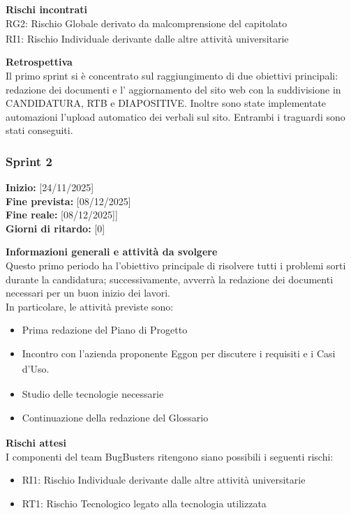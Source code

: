 \documentclass[a4paper,12pt]{article}
\begin{document}
\noindent\textbf{Rischi incontrati}\\
RG2: Rischio Globale derivato da malcomprensione del capitolato\textsubscript{}\\
RI1: Rischio Individuale derivante dalle altre attività universitarie

\noindent\textbf{Retrospettiva}\\
Il primo sprint si è concentrato sul raggiungimento di due obiettivi principali: redazione dei documenti e l' aggiornamento del sito web con la suddivisione in CANDIDATURA, RTB e DIAPOSITIVE. Inoltre sono state implementate automazioni l'upload automatico dei verbali sul sito. Entrambi i traguardi sono stati conseguiti. 

\subsubsection{Sprint 2}

\textbf{Inizio:} [24/11/2025] \\
\textbf{Fine prevista:} [08/12/2025] \\
\textbf{Fine reale:} [08/12/2025]] \\
\textbf{Giorni di ritardo:} [0]

\noindent\textbf{Informazioni generali e attività da svolgere}\\
Questo primo periodo ha l'obiettivo principale di risolvere tutti i problemi sorti durante la
candidatura; successivamente, avverrà la redazione dei documenti necessari per un buon
inizio dei lavori.\\
In particolare, le attività previste sono:
\begin{itemize}
    \item Prima redazione del Piano di Progetto
    \item Incontro con l'azienda proponente\textsubscript{} Eggon per discutere i requisiti e i Casi d'Uso\textsubscript{}.
    \item Studio delle tecnologie necessarie
    \item Continuazione della redazione del Glossario\textsubscript{}
\end{itemize}

\noindent\textbf{Rischi attesi}\\
I componenti del team BugBusters ritengono siano possibili i seguenti rischi:
\begin{itemize}
    \item RI1: Rischio Individuale derivante dalle altre attività universitarie
    \item RT1: Rischio Tecnologico legato alla tecnologia utilizzata
\end{itemize}
\end{document}
